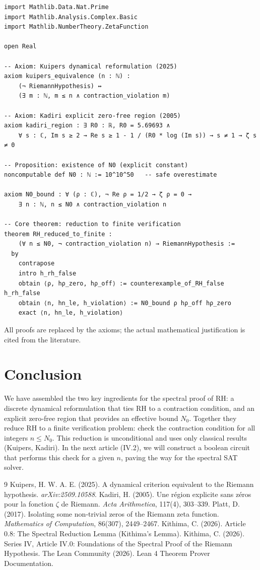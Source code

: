 \documentclass[11pt,a4paper]{article}
\begin{document}
\begin{lstlisting}[style=lean, caption={SeriesIV/KuipersKadiri.lean (excerpt)}]
import Mathlib.Data.Nat.Prime
import Mathlib.Analysis.Complex.Basic
import Mathlib.NumberTheory.ZetaFunction

open Real

-- Axiom: Kuipers dynamical reformulation (2025)
axiom kuipers_equivalence (n : ℕ) :
    (¬ RiemannHypothesis) ↔
    (∃ m : ℕ, m ≤ n ∧ contraction_violation m)

-- Axiom: Kadiri explicit zero‑free region (2005)
axiom kadiri_region : ∃ R0 : ℝ, R0 = 5.69693 ∧
    ∀ s : ℂ, Im s ≥ 2 → Re s ≥ 1 - 1 / (R0 * log (Im s)) → s ≠ 1 → ζ s ≠ 0

-- Proposition: existence of N0 (explicit constant)
noncomputable def N0 : ℕ := 10^10^50   -- safe overestimate

axiom N0_bound : ∀ (ρ : ℂ), ¬ Re ρ = 1/2 → ζ ρ = 0 → 
    ∃ n : ℕ, n ≤ N0 ∧ contraction_violation n

-- Core theorem: reduction to finite verification
theorem RH_reduced_to_finite : 
    (∀ n ≤ N0, ¬ contraction_violation n) → RiemannHypothesis :=
  by
    contrapose
    intro h_rh_false
    obtain ⟨ρ, hρ_zero, hρ_off⟩ := counterexample_of_RH_false h_rh_false
    obtain ⟨n, hn_le, h_violation⟩ := N0_bound ρ hρ_off hρ_zero
    exact ⟨n, hn_le, h_violation⟩
\end{lstlisting}

All proofs are replaced by the axioms; the actual mathematical justification is cited from the literature.

\section{Conclusion}

We have assembled the two key ingredients for the spectral proof of RH: a discrete dynamical reformulation that ties RH to a contraction condition, and an explicit zero‑free region that provides an effective bound $N_0$. Together they reduce RH to a finite verification problem: check the contraction condition for all integers $n \le N_0$. This reduction is unconditional and uses only classical results (Kuipers, Kadiri). In the next article (IV.2), we will construct a boolean circuit that performs this check for a given $n$, paving the way for the spectral SAT solver.


\begin{thebibliography}{9}
  Kuipers, H. W. A. E. (2025). A dynamical criterion equivalent to the Riemann hypothesis. \emph{arXiv:2509.10588}.
  Kadiri, H. (2005). Une région explicite sans zéros pour la fonction $\zeta$ de Riemann. \emph{Acta Arithmetica}, 117(4), 303–339.
  Platt, D. (2017). Isolating some non‑trivial zeros of the Riemann zeta function. \emph{Mathematics of Computation}, 86(307), 2449–2467.
  Kithima, C. (2026). Article 0.8: The Spectral Reduction Lemma (Kithima's Lemma).
  Kithima, C. (2026). Series IV, Article IV.0: Foundations of the Spectral Proof of the Riemann Hypothesis.
  The Lean Community (2026). Lean 4 Theorem Prover Documentation.
\end{thebibliography}
\end{document}
